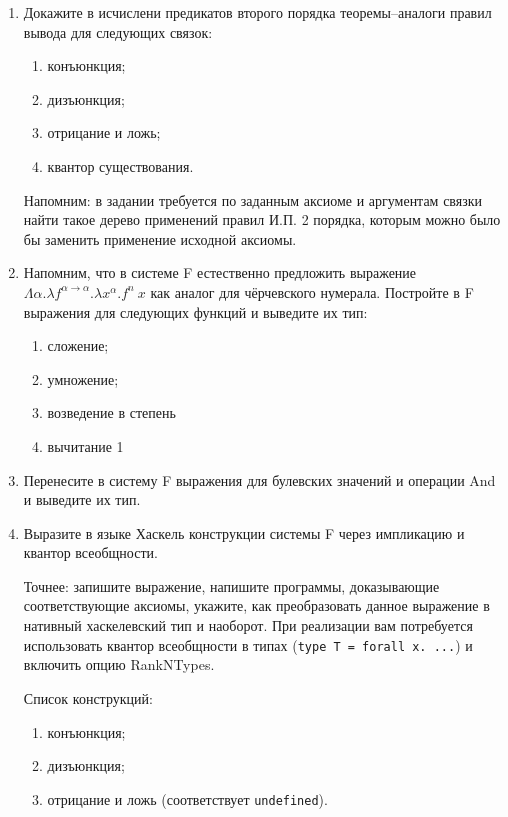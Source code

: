 \documentclass[10pt,a4paper,oneside]{article}
\begin{document}
\begin{enumerate}
\item Докажите в исчислени предикатов второго порядка теоремы--аналоги правил вывода для следующих связок:
\begin{enumerate}
\item конъюнкция;
\item дизъюнкция;
\item отрицание и ложь;
\item квантор существования.
\end{enumerate}

Напомним: в задании требуется по заданным аксиоме и аргументам связки найти такое дерево применений
правил И.П. 2 порядка, которым можно было бы заменить применение исходной аксиомы.

\item Напомним, что в системе F естественно предложить выражение
$\Lambda \alpha.\lambda f^{\alpha\rightarrow\alpha}.\lambda x^\alpha.f^n\ x$
как аналог для чёрчевского нумерала.
Постройте в F выражения для следующих функций и выведите их тип:
\begin{enumerate}
\item сложение;
\item умножение;
\item возведение в степень
\item вычитание 1
\end{enumerate}

\item Перенесите в систему F выражения для булевских значений и операции And и выведите их тип.

\item Выразите в языке Хаскель конструкции системы F через импликацию и квантор всеобщности. 

Точнее: запишите выражение, напишите программы, доказывающие соответствующие аксиомы, 
укажите, как преобразовать данное выражение в нативный хаскелевский тип и наоборот.
При реализации вам потребуется использовать квантор всеобщности в типах
(\verb!type T = forall x. ...!) и включить опцию RankNTypes.

Список конструкций:

\begin{enumerate}
\item конъюнкция;
\item дизъюнкция;
\item отрицание и ложь (соответствует \verb!undefined!).
\end{enumerate}


\end{enumerate}
\end{document}
